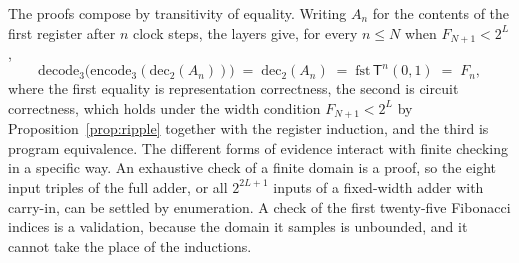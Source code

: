 \documentclass[11pt]{article}
\theoremstyle{definition}
\theoremstyle{remark}
\newcommand{\Tm}{\mathsf{T}}
\begin{document}
The proofs compose by transitivity of equality. Writing $A_n$ for the contents of the first register after $n$ clock steps, the layers give, for every $n \le N$ when $F_{N+1} < 2^{L}$,
\[
\mathrm{decode}_3\big(\mathrm{encode}_3(\mathrm{dec}_2(A_n))\big) \;=\; \mathrm{dec}_2(A_n) \;=\; \mathrm{fst}\,\Tm^{n}(0,1) \;=\; F_n ,
\]
where the first equality is representation correctness, the second is circuit correctness, which holds under the width condition $F_{N+1} < 2^{L}$ by Proposition~\ref{prop:ripple} together with the register induction, and the third is program equivalence. The different forms of evidence interact with finite checking in a specific way. An exhaustive check of a finite domain is a proof, so the eight input triples of the full adder, or all $2^{2L+1}$ inputs of a fixed-width adder with carry-in, can be settled by enumeration. A check of the first twenty-five Fibonacci indices is a validation, because the domain it samples is unbounded, and it cannot take the place of the inductions.
\end{document}
